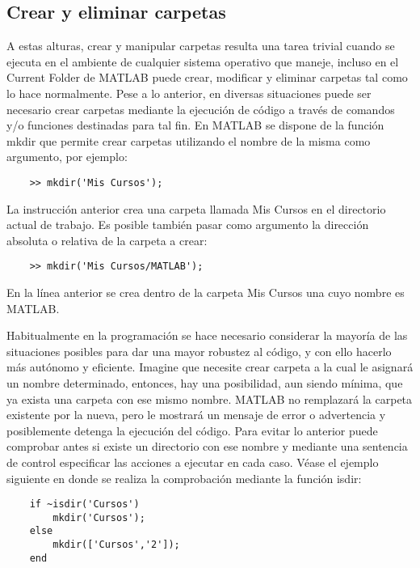 \subsection{Crear y eliminar carpetas}

A estas alturas, crear y manipular carpetas resulta una tarea trivial cuando se ejecuta 
en el ambiente de cualquier sistema operativo que maneje, incluso en el Current Folder 
de MATLAB puede crear, modificar y eliminar carpetas tal como lo hace normalmente. Pese 
a lo anterior, en diversas situaciones puede ser necesario crear carpetas mediante la 
ejecución de código a través de comandos y/o funciones destinadas para tal fin. En MATLAB 
se dispone de la función mkdir que permite crear carpetas utilizando el nombre de la 
misma como argumento, por ejemplo:

\begin{verbatim}
	>> mkdir('Mis Cursos');
\end{verbatim}

La instrucción anterior crea una carpeta llamada Mis Cursos en el directorio actual de 
trabajo. Es posible también pasar como argumento la dirección absoluta o relativa de 
la carpeta a crear:

\begin{verbatim}
	>> mkdir('Mis Cursos/MATLAB');
\end{verbatim}

En la línea anterior se crea dentro de la carpeta Mis Cursos una cuyo nombre es MATLAB.

Habitualmente en la programación se hace necesario considerar la mayoría de las 
situaciones posibles para dar una mayor robustez al código, y con ello hacerlo más 
autónomo y eficiente. Imagine que necesite crear carpeta a la cual le asignará un 
nombre determinado, entonces, hay una posibilidad, aun siendo mínima, que ya exista 
una carpeta con ese mismo nombre. MATLAB no remplazará la carpeta existente por la nueva, 
pero le mostrará un mensaje de error o advertencia y posiblemente detenga la ejecución 
del código. Para evitar lo anterior puede comprobar antes si existe un directorio con 
ese nombre y mediante una sentencia de control especificar las acciones a ejecutar en 
cada caso. Véase el ejemplo siguiente en donde se realiza la comprobación mediante 
la función isdir:

\begin{verbatim}
	if ~isdir('Cursos')
	    mkdir('Cursos');
	else
	    mkdir(['Cursos','2']);
	end
\end{verbatim}

